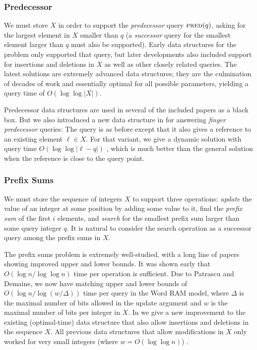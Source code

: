 \subsubsection{Predecessor}
We must store $X$ in order to support the \emph{predecessor} query $\textsc{pred}(q)$, asking for the largest element in $X$ smaller than $q$ (a \emph{successor} query for the smallest element larger than $q$ must also be supported). Early data structures for the problem only supported that query, but later developments also included support for insertions and deletions in $X$ as well as other closely related queries. The latest solutions are extremely advanced data structures; they are the culmination of decades of work and essentially optimal for all possible parameters, yielding a query time of $O(\log \log |X|)$. 

Predecessor data structures are used in several of the included papers as a black box. But we also introduced a new data structure in  for answering \emph{finger predecessor} queries: The query is as before except that it also gives a reference to an existing element $\ell \in X$. For that variant, we give a dynamic solution with query time $O(\log \log |\ell-q|)$ , which is much better than the general solution when the reference is close to the query point.

\subsubsection{Prefix Sums}
We must store the sequence of integers $X$ to support three operations: \emph{update} the value of an integer at some position by adding some value to it, find the \emph{prefix sum} of the first $i$ elements, and \emph{search} for the smallest prefix sum larger than some query integer $q$. It is natural to consider the search operation as a successor query among the prefix sums in $X$. 

The prefix sums problem is extremely well-studied, with a long line of papers showing improved upper and lower bounds. It was shown early that $O(\log n / \log \log n)$ time per operation is sufficient. Due to Patrascu and Demaine, we now have matching upper and lower bounds of $O(\log n / \log (w / \Delta))$  time per query in the Word RAM model, where $\Delta$ is the maximal number of bits allowed in the update argument and $w$ is the maximal number of bits per integer in $X$. In  we give a new improvement to the existing (optimal-time) data structure that also allow insertions and deletions in the sequence $X$. All previous data structures that allow modifications in $X$ only worked for very small integers (where $w = O(\log \log n)$) . 

